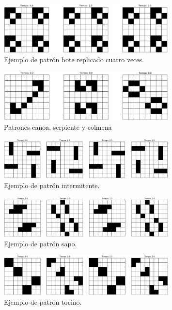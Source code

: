 \documentclass[12pt]{article}
\begin{document}
\begin{figure}
  \centering
  \includegraphics[width=0.8\textwidth]{imagenes/estatico2.png}
  \caption{Ejemplo de patrón bote replicado cuatro veces.\label{img:estatico2}}
\end{figure}

\begin{figure}
  \centering
  \includegraphics[width=0.8\textwidth]{imagenes/estatico3.png}
  \caption{Patrones canoa, serpiente y colmena\label{img:estatico3}}
\end{figure}



\begin{figure}
  \centering
  \includegraphics[width=0.8\textwidth]{imagenes/oscilante1.png}
  \caption{Ejemplo de patrón intermitente.\label{img:oscilante1}}
\end{figure}

\begin{figure}
  \centering
  \includegraphics[width=0.8\textwidth]{imagenes/oscilante2.png}
  \caption{Ejemplo de patrón sapo.\label{img:oscilante2}}
\end{figure}

\begin{figure}
  \centering
  \includegraphics[width=0.8\textwidth]{imagenes/oscilante3.png}
  \caption{Ejemplo de patrón tocino.\label{img:oscilante3}}
\end{figure}
\end{document}

